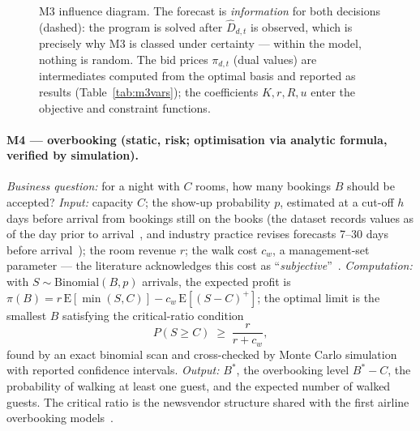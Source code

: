 \begin{figure}[H]
\centering
{}
\caption{M3 influence diagram. The forecast is \emph{information} for both decisions (dashed): the program is solved after $\hat{D}_{d,t}$ is observed, which is precisely why M3 is classed under certainty --- within the model, nothing is random. The bid prices $\pi_{d,t}$ (dual values) are intermediates computed from the optimal basis and reported as results (Table~\ref{tab:m3vars}); the coefficients $K, r, R, u$ enter the objective and constraint functions.}
\label{fig:id-m3}
\end{figure}

\paragraph{M4 --- overbooking (static, risk; optimisation via analytic formula, verified by simulation).}
\emph{Business question:} for a night with $C$ rooms, how many bookings $B$ should be accepted? \emph{Input:} capacity $C$; the show-up probability $p$, estimated at a cut-off $h$ days before arrival from bookings still on the books (the dataset records values as of the day prior to arrival~\cite{antonio2019}, and industry practice revises forecasts 7--30 days before arrival~\cite{jawabreh2026}); the room revenue $r$; the walk cost $c_w$, a management-set parameter --- the literature acknowledges this cost as ``\emph{subjective}''~\cite{pimentel2019}. \emph{Computation:} with $S \sim \mathrm{Binomial}(B, p)$ arrivals, the expected profit is $\pi(B) = r\,\mathrm{E}[\min(S,C)] - c_w\,\mathrm{E}[(S-C)^+]$; the optimal limit is the smallest $B$ satisfying the critical-ratio condition
\begin{equation}
P(S \geq C) \;\geq\; \frac{r}{r + c_w},
\label{eq:m4ratio}
\end{equation}
found by an exact binomial scan and cross-checked by Monte Carlo simulation with reported confidence intervals. \emph{Output:} $B^{*}$, the overbooking level $B^{*}-C$, the probability of walking at least one guest, and the expected number of walked guests. The critical ratio is the newsvendor structure shared with the first airline overbooking models~\cite{rothstein1971,talluri2004}.

